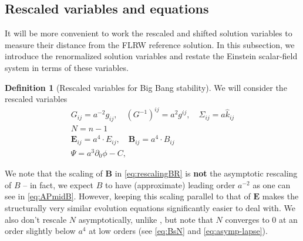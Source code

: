 \documentclass[11pt,leqno,textwidth=10cm]{amsart}
\numberwithin{equation}{section}
\theoremstyle{definition}
\newtheorem{definition}{Definition}[section]
\theoremstyle{plain}
\newcommand{\1}{\mathbbm{1}}
\newcommand{\del}{\partial}
\newcommand{\RE}{\bm{E}}
\newcommand{\RB}{\bm{B}}
\newcommand{\change}[1]{\color{black}#1\color{black}}
\begin{document}
\subsection{Rescaled variables and equations}\label{subsec:REEq}

It will be more convenient to work the rescaled and shifted solution variables to measure their distance from the FLRW reference solution. In this subsection, we introduce the renormalized solution variables and restate the Einstein scalar-field system in terms of these variables.

\begin{definition}[Rescaled variables for Big Bang stability]\label{def:rescaled}
We will consider the rescaled variables
\begin{subequations}
\begin{gather}
\label{eq:rescalingGK}
G_{ij}=a^{-2}g_{ij},\quad (G^{-1})^{ij}=a^2g^{ij},\quad \Sigma_{ij}=a\hat{k}_{ij}\\
\label{eq:rescalingL} N=n-1\\
\label{eq:rescalingBR}
\RE_{ij}=a^4\cdot E_{ij},\quad \RB_{ij}=a^4\cdot B_{ij}\\
\label{eq:rescalingMatter}
\Psi=a^3\del_0\phi-C,
\end{gather}
\end{subequations}
\end{definition}
We note that the scaling of $\RB$ in \eqref{eq:rescalingBR} is \textbf{not} the asymptotic rescaling of $B$ -- in fact, we expect $B$ to have (approximate) leading order $a^{-2}$ as one can see in \eqref{eq:APmidB}. However, keeping this scaling parallel to that of $\RE$ makes the structurally very similar evolution equations significantly easier to deal with. We also don't rescale $N$ asymptotically\change{, unlike \cite{Rodnianski2014, Speck2018}, but note that $N$ converges to $0$ at an order slightly below $a^4$ at low orders (see \eqref{eq:BsN} and \eqref{eq:asymp-lapse}).}
\end{document}

